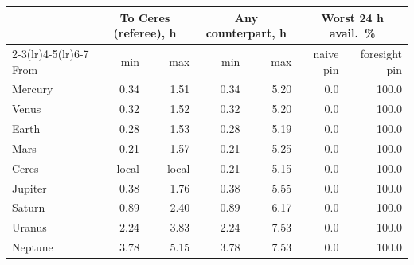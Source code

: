 \begin{tabular}{l rr rr rr}
\toprule
 & \multicolumn{2}{c}{To Ceres (referee), h} & \multicolumn{2}{c}{Any counterpart, h} & \multicolumn{2}{c}{Worst 24 h avail.\ \%}\\
\cmidrule(lr){2-3}\cmidrule(lr){4-5}\cmidrule(lr){6-7}
From & min & max & min & max & naive pin & foresight pin\\
\midrule
Mercury & 0.34 & 1.51 & 0.34 & 5.20 & 0.0 & 100.0\\
Venus & 0.32 & 1.52 & 0.32 & 5.20 & 0.0 & 100.0\\
Earth & 0.28 & 1.53 & 0.28 & 5.19 & 0.0 & 100.0\\
Mars & 0.21 & 1.57 & 0.21 & 5.25 & 0.0 & 100.0\\
Ceres & local & local & 0.21 & 5.15 & 0.0 & 100.0\\
Jupiter & 0.38 & 1.76 & 0.38 & 5.55 & 0.0 & 100.0\\
Saturn & 0.89 & 2.40 & 0.89 & 6.17 & 0.0 & 100.0\\
Uranus & 2.24 & 3.83 & 2.24 & 7.53 & 0.0 & 100.0\\
Neptune & 3.78 & 5.15 & 3.78 & 7.53 & 0.0 & 100.0\\
\bottomrule
\end{tabular}
